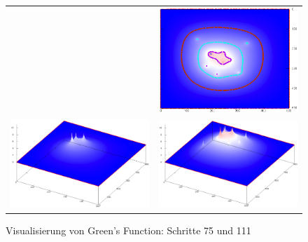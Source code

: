\begin{refsection}
\begin{figure}
\begin{tabular}{cc}
& \includegraphics[width=\breite]{green/images/resultate/cp/step0111.png}\vspace{1cm}\\
\includegraphics[width=\breite]{green/images/resultate/np/step0057.png}
& \includegraphics[width=\breite]{green/images/resultate/np/step0111.png}
\end{tabular}		
\caption{Visualisierung von Green's Function: Schritte 75 und 111 }
\end{figure}
	

\end{refsection}

